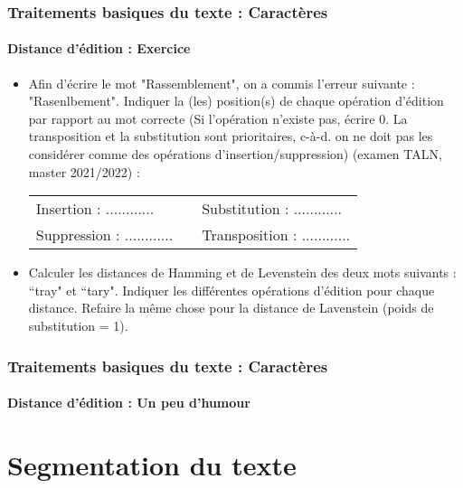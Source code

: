 \documentclass[xcolor=table]{beamer}
\begin{document}
\begin{frame}
	\frametitle{Traitements basiques du texte : Caractères}
	\framesubtitle{Distance d'édition : Exercice}
	
	\begin{itemize}
		\item Afin d'écrire le mot "Rassemblement",  on a commis l'erreur suivante : "Rasenlbement". Indiquer la (les) position(s) de chaque opération d'édition par rapport au mot correcte (Si l'opération n'existe pas, écrire 0. La transposition et la substitution sont prioritaires, c-à-d. on ne doit pas les considérer comme des opérations d'insertion/suppression) (examen TALN, master 2021/2022) :
		\begin{tabular}{|lll|}
			\hline 
			Insertion : ............ & & Substitution : ............ \\
			Suppression : ............ & & Transposition : ............ \\
			\hline
		\end{tabular}
		
		\item Calculer les distances de Hamming et de  Levenstein des deux mots suivants : ``tray" et ``tary".
		Indiquer les différentes opérations d'édition pour chaque distance. Refaire la même chose pour la distance de Lavenstein (poids de substitution = 1).
	\end{itemize}
	
\end{frame}

\begin{frame}
\frametitle{Traitements basiques du texte : Caractères}
\framesubtitle{Distance d'édition : Un peu d'humour}

\begin{center}
\end{center}

\end{frame}

\section{Segmentation du texte}
\end{document}
